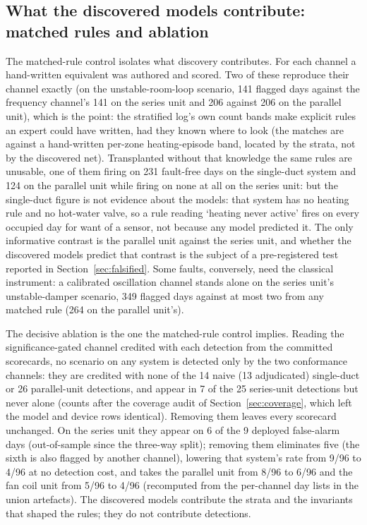 \documentclass[11pt,letterpaper]{article}
\begin{document}
\subsection{What the discovered models contribute: matched rules and ablation}

The matched-rule control isolates what discovery contributes. For each channel a hand-written equivalent was authored and scored. Two of these reproduce their channel exactly (on the unstable-room-loop scenario, 141 flagged days against the frequency channel's 141 on the series unit and 206 against 206 on the parallel unit), which is the point: the stratified log's own count bands make explicit rules an expert could have written, had they known where to look (the matches are against a hand-written per-zone heating-episode band, located by the strata, not by the discovered net). Transplanted without that knowledge the same rules are unusable, one of them firing on 231 fault-free days on the single-duct system and 124 on the parallel unit while firing on none at all on the series unit: but the single-duct figure is not evidence about the models: that system has no heating rule and no hot-water valve, so a rule reading `heating never active' fires on every occupied day for want of a sensor, not because any model predicted it. The only informative contrast is the parallel unit against the series unit, and whether the discovered models predict that contrast is the subject of a pre-registered test reported in Section~\ref{sec:falsified}. Some faults, conversely, need the classical instrument: a calibrated oscillation channel stands alone on the series unit's unstable-damper scenario, 349 flagged days against at most two from any matched rule (264 on the parallel unit's).

The decisive ablation is the one the matched-rule control implies. Reading the significance-gated channel credited with each detection from the committed scorecards, no scenario on any system is detected only by the two conformance channels: they are credited with none of the 14 naive (13 adjudicated) single-duct or 26 parallel-unit detections, and appear in 7 of the 25 series-unit detections but never alone (counts after the coverage audit of Section~\ref{sec:coverage}, which left the model and device rows identical). Removing them leaves every scorecard unchanged. On the series unit they appear on 6 of the 9 deployed false-alarm days (out-of-sample since the three-way split); removing them eliminates five (the sixth is also flagged by another channel), lowering that system's rate from 9/96 to 4/96 at no detection cost, and takes the parallel unit from 8/96 to 6/96 and the fan coil unit from 5/96 to 4/96 (recomputed from the per-channel day lists in the union artefacts). The discovered models contribute the strata and the invariants that shaped the rules; they do not contribute detections.
\end{document}
